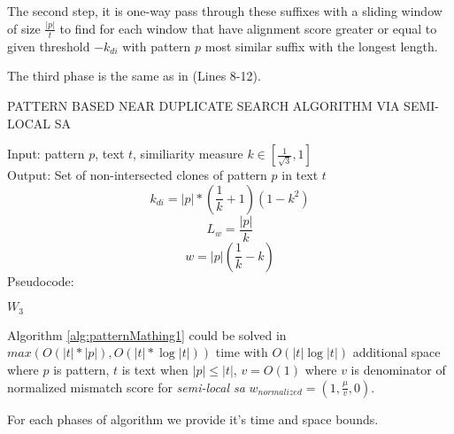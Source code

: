 The second step, it is one-way pass through these suffixes with a sliding window of size $\frac{|p|}{t}$ to find for each window that have alignment score greater or equal to given threshold $-k_{di}$ with pattern $p$ most similar suffix with the longest length. 

The third phase is the same as in \cite{luciv2019interactive} (Lines 8-12).  



\begin{algorithm}[H]
\caption{PATTERN BASED NEAR DUPLICATE
SEARCH ALGORITHM VIA SEMI-LOCAL SA}
\label{alg:patternMathing1}
Input: pattern $p$, text $t$, similiarity measure $k \in  [ \frac{1}{\sqrt{3}} ,1  ]$\\
Output: Set of non-intersected clones of pattern $p$ in text $t$
\begin{equation}
    k_{di}=|p|*(\frac{1}{k}+1)(1-k^2)
\end{equation}
\begin{equation}
 L_{w} = \frac{|p|} {k}
\end{equation}
\begin{equation}
  w = |p|(\frac{1}{k} - k)
\end{equation}
Pseudocode:
\begin{algorithmic}[1]
\ENDIF
\ENDFOR
\RETURN $W_3$

\end{algorithmic}
\end{algorithm}


\begin{theorem}
Algorithm \ref{alg:patternMathing1} could  be solved in
 $max(O(|t|*|p|),O(|t| * \log |t|))$  time with $O( |t| \log |t|)$ additional space where $p$ is pattern, $t$ is text when $|p| \leq |t|$, $v=O(1)$ where $v$ is denominator of normalized mismatch score for \emph{semi-local sa}
$w_{normalized} = (1,\frac{\mu}{v},0)$.
\end{theorem}

For each phases of algorithm we provide it's time and space bounds.

